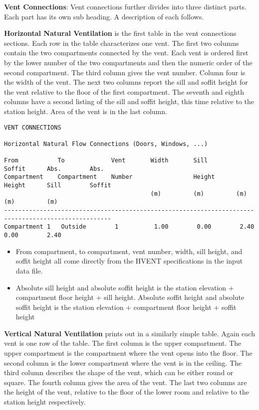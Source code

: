 \textbf{Vent Connections}: Vent connections further divides into three distinct parts.  Each part has its own sub heading.  A description of each follows.

\textbf{Horizontal Natural Ventilation} is the first table in the vent connections sections.  Each row in the table characterizes one vent.  The first two columns contain the two compartments connected by the vent.  Each vent is ordered first by the lower number of the two compartments and then the numeric order of the second compartment.  The third column gives the vent number.  Column four is the width of the vent.  The next two columns report the sill and soffit height for the vent relative to the floor of the first compartment.  The seventh and eighth columns have a second listing of the sill and soffit height, this time relative to the station height.  Area of the vent is in the last column.

\begin{lstlisting}[basicstyle=\tiny]
VENT CONNECTIONS

Horizontal Natural Flow Connections (Doors, Windows, ...)

From           To             Vent       Width       Sill        Soffit      Abs.        Abs.      
Compartment    Compartment    Number                 Height      Height      Sill        Soffit
                                         (m)         (m)         (m)         (m)         (m)         
----------------------------------------------------------------------------------------------------
Compartment 1   Outside        1          1.00        0.00        2.40        0.00        2.40
\end{lstlisting}

\begin{itemize}
\item From compartment, to compartment, vent number, width, sill height, and soffit height all come directly from the HVENT specifications in the input data file.
\item Absolute sill height and absolute soffit height is the station elevation + compartment floor height + sill height. Absolute soffit height and absolute soffit height is the station elevation + compartment floor height + soffit height
\end{itemize}

\textbf{Vertical Natural Ventilation} prints out in a similarly simple table.  Again each vent is one row of the table.  The first column is the upper compartment.  The upper compartment is the compartment where the vent opens into the floor.  The second column is the lower compartment where the vent is in the ceiling.  The third column describes the shape of the vent, which can be either round or square.  The fourth column gives the area of the vent.  The last two columns are the height of the vent, relative to the floor of the lower room and relative to the station height respectively.

